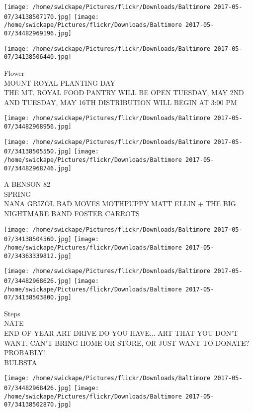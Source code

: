 \documentclass[10pt,letterpaper]{article}
\begin{document}
\texttt{[image: /home/swickape/Pictures/flickr/Downloads/Baltimore 2017-05-07/34138507170.jpg]}
\texttt{[image: /home/swickape/Pictures/flickr/Downloads/Baltimore 2017-05-07/34482969196.jpg]}

\texttt{[image: /home/swickape/Pictures/flickr/Downloads/Baltimore 2017-05-07/34138506440.jpg]}

Flower\\
MOUNT ROYAL PLANTING DAY\\
THE MT. ROYAL FOOD PANTRY WILL BE OPEN TUESDAY, MAY 2ND AND TUESDAY, MAY 16TH DISTRIBUTION WILL BEGIN AT 3:00 PM\\
\pagebreak

\texttt{[image: /home/swickape/Pictures/flickr/Downloads/Baltimore 2017-05-07/34482968956.jpg]}

\vspace{0.25in}
\texttt{[image: /home/swickape/Pictures/flickr/Downloads/Baltimore 2017-05-07/34138505550.jpg]}
\texttt{[image: /home/swickape/Pictures/flickr/Downloads/Baltimore 2017-05-07/34482968746.jpg]}

A BENSON 82\\
SPRING\\
NANA GRIZOL BAD MOVES MOTHPUPPY MATT ELLIN + THE BIG NIGHTMARE BAND FOSTER CARROTS\\
\pagebreak

\texttt{[image: /home/swickape/Pictures/flickr/Downloads/Baltimore 2017-05-07/34138504560.jpg]}
\texttt{[image: /home/swickape/Pictures/flickr/Downloads/Baltimore 2017-05-07/34363339812.jpg]}

\texttt{[image: /home/swickape/Pictures/flickr/Downloads/Baltimore 2017-05-07/34482968626.jpg]}
\texttt{[image: /home/swickape/Pictures/flickr/Downloads/Baltimore 2017-05-07/34138503800.jpg]}

Steps\\
NATE\\
END OF YEAR ART DRIVE DO YOU HAVE... ART THAT YOU DON'T WANT, CAN'T BRING HOME OR STORE, OR JUST WANT TO DONATE?  PROBABLY!\\
BULBSTA\\
\pagebreak

\texttt{[image: /home/swickape/Pictures/flickr/Downloads/Baltimore 2017-05-07/34482968426.jpg]}
\texttt{[image: /home/swickape/Pictures/flickr/Downloads/Baltimore 2017-05-07/34138502870.jpg]}
\end{document}

